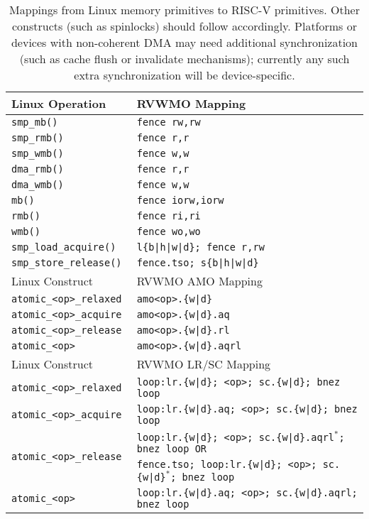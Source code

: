 \begin{table}[h!]
  \centering
  \begin{tabular}{|l|l|}
    \hline
    Linux Operation           & RVWMO Mapping \\
    \hline
    \hline
    \tt smp\_mb()             & \tt fence rw,rw \\
    \hline
    \tt smp\_rmb()            & \tt fence r,r \\
    \hline
    \tt smp\_wmb()            & \tt fence w,w \\
    \hline
    \tt dma\_rmb()            & \tt fence r,r \\
    \hline
    \tt dma\_wmb()            & \tt fence w,w \\
    \hline
    \tt mb()                  & \tt fence iorw,iorw \\
    \hline
    \tt rmb()                 & \tt fence ri,ri \\
    \hline
    \tt wmb()                 & \tt fence wo,wo \\
    \hline
    \tt smp\_load\_acquire()   & \tt l\{b|h|w|d\}; fence r,rw \\
    \hline
    \tt smp\_store\_release()  & \tt fence.tso; s\{b|h|w|d\}  \\
    \hline
    \hline
    Linux Construct            & RVWMO AMO Mapping        \\
    \hline
    \tt atomic\_<op>\_relaxed  & \tt amo<op>.\{w|d\}      \\
    \hline
    \tt atomic\_<op>\_acquire  & \tt amo<op>.\{w|d\}.aq   \\
    \hline
    \tt atomic\_<op>\_release  & \tt amo<op>.\{w|d\}.rl   \\
    \hline
    \tt atomic\_<op>           & \tt amo<op>.\{w|d\}.aqrl \\
    \hline
    \hline
    Linux Construct            & RVWMO LR/SC Mapping\\
    \hline
    \tt atomic\_<op>\_relaxed  & \tt loop:\@ lr.\{w|d\}; <op>; sc.\{w|d\}; bnez loop \\
    \hline
    \tt atomic\_<op>\_acquire  & \tt loop:\@ lr.\{w|d\}.aq; <op>; sc.\{w|d\}; bnez loop \\
    \hline
    \multirow{2}{*}{\tt atomic\_<op>\_release}
      & \tt loop:\@ lr.\{w|d\}; <op>; sc.\{w|d\}.aqrl$^*$; bnez loop \textrm{OR} \\
      & \tt fence.tso; loop:\@ lr.\{w|d\}; <op>; sc.\{w|d\}$^*$; bnez loop \\
    \hline
    \tt atomic\_<op>           & \tt loop:\@ lr.\{w|d\}.aq; <op>; sc.\{w|d\}.aqrl; bnez loop \\
    \hline
  \end{tabular}
  \caption{Mappings from Linux memory primitives to RISC-V primitives.  Other constructs (such as spinlocks) should follow accordingly.  Platforms or devices with non-coherent DMA may need additional synchronization (such as cache flush or invalidate mechanisms); currently any such extra synchronization will be device-specific.}
  \label{tab:linuxmappings}
\end{table}

